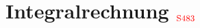 \newcommand{\titleinfo}{Analysis 2E - Formelsammlung}
\newcommand{\authorinfo}{F. Braun, L. Schmid, U. Giger, R. Koller, E. Ammann, S. Arnold, C. Gwerder, S. Koerner, L. Leuenberger}
\newcommand{\versioninfo}{$Revision: $ \today}


\newcommand{\formelbuch}[1]{$_{\textcolor{red}{\mbox{\small{S#1}}}}$}
\newcommand{\verweis}[2]{\small{(siehe auch \ref{#1}, #2 (S. \pageref{#1}))}}
\newcommand{\subsubadd}[1]{\textcolor{black}{\mbox{#1}}}



\setlength{\parindent}{0pt}
           
\section{Integralrechnung \formelbuch{483}}
